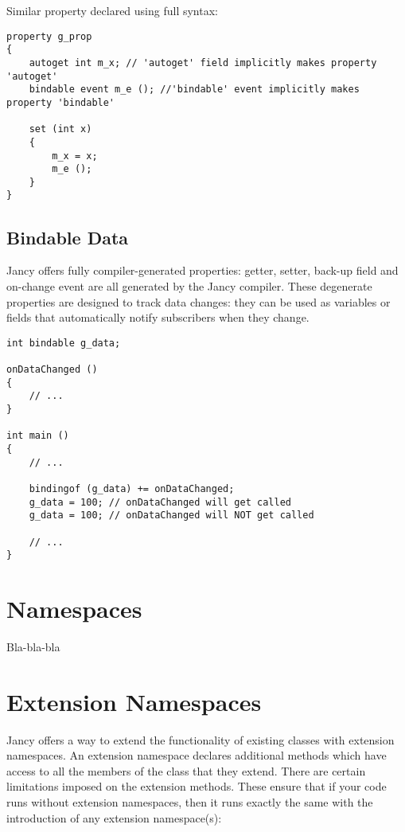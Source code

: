 \documentclass[oneside]{book}
\begin{document}
Similar property declared using full syntax:

\begin{lstlisting}
property g_prop
{   
    autoget int m_x; // 'autoget' field implicitly makes property 'autoget'
    bindable event m_e (); //'bindable' event implicitly makes property 'bindable'

    set (int x)
    {
        m_x = x;
        m_e ();
    }
}
\end{lstlisting}

\subsection{Bindable Data}
Jancy offers fully compiler-generated properties: getter, setter, back-up field and on-change event are all generated by the Jancy compiler. These degenerate properties are designed to track data changes: they can be used as variables or fields that automatically notify subscribers when they change.

\begin{lstlisting}
int bindable g_data;

onDataChanged ()
{
    // ...
}

int main ()
{
    // ...

    bindingof (g_data) += onDataChanged;
    g_data = 100; // onDataChanged will get called
    g_data = 100; // onDataChanged will NOT get called

    // ...
}
\end{lstlisting}

\section{Namespaces}

Bla-bla-bla

\section{Extension Namespaces}
Jancy offers a way to extend the functionality of existing classes with extension namespaces. An extension namespace declares additional methods which have access to all the members of the class that they extend. There are certain limitations imposed on the extension methods. These ensure that if your code runs without extension namespaces, then it runs exactly the same with the introduction of any extension namespace(s):
\end{document}
